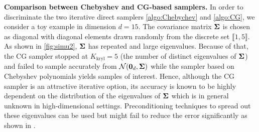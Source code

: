 \documentclass[nohypdvips,onefignum,onetabnum]{siamart171218}
\begin{document}
\noindent\textbf{Comparison between Chebyshev and CG-based samplers.} In order to discriminate the two iterative direct samplers \cref{algo:Chebychev} and \cref{algo:CG}, we consider a toy example in dimension $d=15$.
The covariance matrix $\mathbf{\Sigma}$ is chosen as diagonal with diagonal elements drawn randomly from the discrete set $\llbracket1,5\rrbracket$.
As shown in \cref{fig:simu2}, $\mathbf{\Sigma}$ has repeated and large eigenvalues.
Because of that, the CG sampler stopped at $K_{\mathrm{kryl}}=5$ (the number of distinct eigenvalues of $\mathbf{\Sigma}$) and failed to sample accurately from $\mathcal{N}(\mathbf{0}_d,\mathbf{\Sigma})$ while the sampler based on Chebyshev polynomials yields samples of interest.
Hence, although the CG sampler is an attractive iterative option, its accuracy is known to be highly dependent on the distribution of the eigenvalues of $\mathbf{\Sigma}$ which is in general unknown in high-dimensional settings.
Preconditioning techniques to spread out these eigenvalues can be used but might fail to reduce the error significantly as shown in \cite{Parker2012}. 
%
\end{document}
